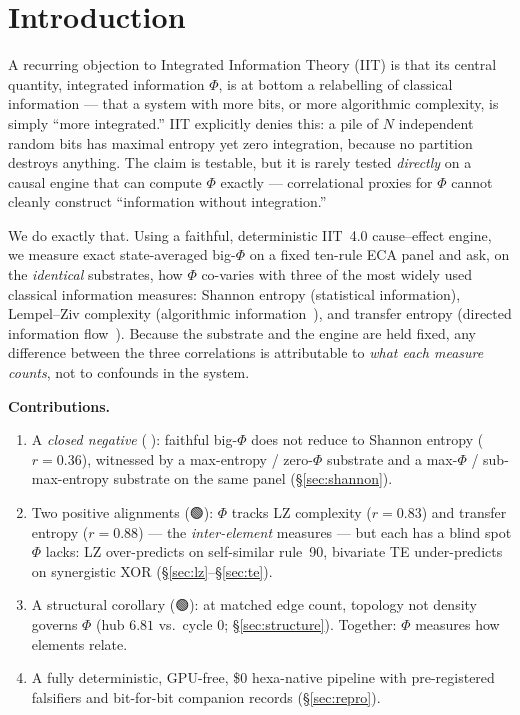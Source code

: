 \documentclass[11pt,a4paper]{article}
\providecommand{\tierGreen}{🟢}
\providecommand{\tierRed}{🔴}
\newcommand{\bigphi}{\ensuremath{\Phi}}
\begin{document}
\section{Introduction}
\label{sec:intro}

A recurring objection to Integrated Information Theory (IIT)
\citep{tononi2016,oizumi2014} is that its central quantity, integrated
information \bigphi{}, is at bottom a relabelling of classical
information --- that a system with more bits, or more algorithmic
complexity, is simply ``more integrated.'' IIT explicitly denies this:
a pile of \(N\) independent random bits has maximal entropy yet zero
integration, because no partition destroys anything. The claim is
testable, but it is rarely tested \emph{directly} on a causal engine that
can compute \bigphi{} exactly --- correlational proxies for \bigphi{}
cannot cleanly construct ``information without integration.''

We do exactly that. Using a faithful, deterministic IIT~4.0
cause--effect engine, we measure exact state-averaged big-\bigphi{} on a
fixed ten-rule ECA panel and ask, on the \emph{identical} substrates, how
\bigphi{} co-varies with three of the most widely used classical
information measures: Shannon entropy (statistical information),
Lempel--Ziv complexity (algorithmic information~\citep{lempelziv1976}),
and transfer entropy (directed information flow~\citep{schreiber2000}).
Because the substrate and the engine are held fixed, any difference
between the three correlations is attributable to \emph{what each measure
counts}, not to confounds in the system.

\medskip
\noindent\textbf{Contributions.}
\begin{enumerate}\itemsep0.3em
\item A \emph{closed negative} (\tierRed): faithful big-\bigphi{} does not
reduce to Shannon entropy (\(r=0.36\)), witnessed by a max-entropy /
zero-\bigphi{} substrate and a max-\bigphi{} / sub-max-entropy substrate
on the same panel (\S\ref{sec:shannon}).
\item Two positive alignments (\tierGreen): \bigphi{} tracks LZ complexity
(\(r=0.83\)) and transfer entropy (\(r=0.88\)) --- the \emph{inter-element}
measures --- but each has a blind spot \bigphi{} lacks: LZ over-predicts on
self-similar rule~90, bivariate TE under-predicts on synergistic XOR
(\S\ref{sec:lz}--\S\ref{sec:te}).
\item A structural corollary (\tierGreen): at matched edge count, topology
not density governs \bigphi{} (hub \(6.81\) vs.\ cycle \(0\);
\S\ref{sec:structure}). Together: \bigphi{} measures how elements relate.
\item A fully deterministic, GPU-free, \$0 hexa-native pipeline with
pre-registered falsifiers and bit-for-bit companion records
(\S\ref{sec:repro}).
\end{enumerate}
\end{document}
